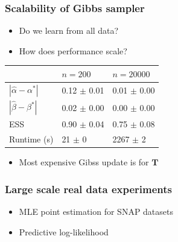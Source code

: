 \documentclass[final,hyperref={pdfpagelabels=false},noamsthm]{beamer}
\newcommand{\bfT}{\mathbf{T}}
\begin{document}
\begin{frame}
	\frametitle{Scalability of Gibbs sampler}
	\begin{itemize}
		\item Do we learn from all data?
		\item How does performance scale?
	\end{itemize}
	\pause
	
	\begin{table}[t]
		\label{tab:ess:scale:n}
		\vspace*{-0.25\baselineskip}
		\begin{center}
			\begin{tabular}{l  ll}
				& $n=200$ &  $n=20000$ \\ 
				\hline
				$|\hat{\alpha} - \alpha^*|$ & 0.12 $\pm$ 0.01 &  0.01 $\pm$ 0.00 \\ 
				
				$|\hat{\beta} - \beta^*|$ &  0.02 $\pm$ 0.00  &    0.00 $\pm$ 0.00  \\ 
				
				ESS &  0.90 $\pm$ 0.04  &   0.75 $\pm$ 0.08  \\  
				
				Runtime (s) &  21 $\pm$ 0   &  2267 $\pm$ 2  \\ 
				
			\end{tabular}
		\end{center}
	\end{table}
	\begin{itemize}
		\item Most expensive Gibss update is for $\bfT$
	\end{itemize}
\end{frame}

\begin{frame}
	\frametitle{Large scale real data experiments}
	\begin{itemize}
		\item MLE point estimation for SNAP datasets
		\item Predictive log-likelihood
	\end{itemize}
	
\end{frame}
\end{document}
